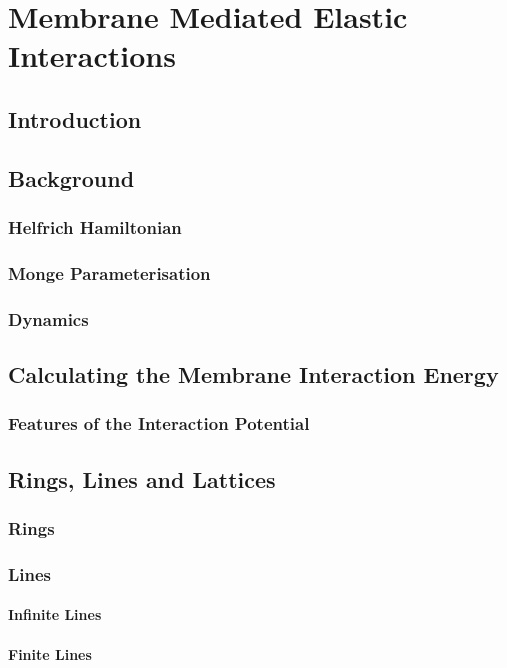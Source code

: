 \chapter{\label{ch:2-elastic}Membrane Mediated Elastic Interactions} 

\minitoc

\section{Introduction}
\section{Background}
\subsection{Helfrich Hamiltonian}
\subsection{Monge Parameterisation}
\subsection{Dynamics}
\section{Calculating the Membrane Interaction Energy}
\subsection{Features of the Interaction Potential}
\section{Rings, Lines and Lattices}
\subsection{Rings}
\subsection{Lines}
\subsubsection{Infinite Lines}
\subsubsection{Finite Lines}
